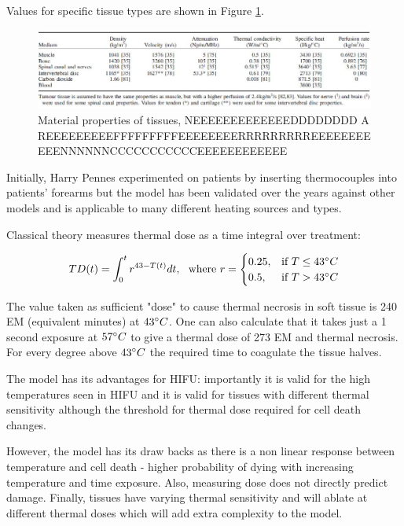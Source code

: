 \documentclass[11pt]{article} %
\begin{document}
	Values for specific tissue types are shown in Figure \ref{fig:tissueproperties}. 
	
	\begin{figure}
		\centering
		\includegraphics[width=1\linewidth]{Report_images/tissueproperties}
		\caption{Material properties of tissues, NEEEEEEEEEEEEEDDDDDDDD A REEEEEEEEEFFFFFFFFFEEEEEEEERRRRRRRRREEEEEEEEEEENNNNNNCCCCCCCCCCCEEEEEEEEEEEE}
		\label{fig:tissueproperties}
	\end{figure}
	
	Initially, Harry Pennes experimented on patients by inserting thermocouples into patients' forearms but the model has been validated over the years against other models and is applicable to many different heating sources and types.
	
	
	
	
	Classical theory \cite{Sapareto1984}  measures thermal dose as a time integral over treatment:
	
\begin{equation}
TD(t)=\int_{0}^{t}r^{43-T(t)}dt,\ \ \text{where  } r=
\begin{cases}
0.25, & \text{if}\ T\leq 43 \degree C \\
0.5, & \text{if}\ T>43 \degree C
\end{cases}
\end{equation}
	
	The value taken as sufficient "dose" to cause thermal necrosis in soft tissue is 240 EM (equivalent minutes) at $43 \degree C $. One can also calculate that it takes just a 1 second exposure at $57 \degree C $ to give a thermal dose of 273 EM and thermal necrosis. For every degree above  $43 \degree C $ the required time to coagulate the tissue halves. 
	
	The model has its advantages for HIFU: importantly it is valid for the high temperatures seen in HIFU and it is valid for tissues with different thermal sensitivity although the threshold for thermal dose required for cell death changes. 
	
	However, the model has its draw backs as there is a non linear response between temperature and cell death - higher probability of dying with increasing temperature and time exposure. Also, measuring dose does not directly predict damage. Finally, tissues have varying thermal sensitivity and will ablate at different thermal doses which will add extra complexity to the model.
	
\end{document}
